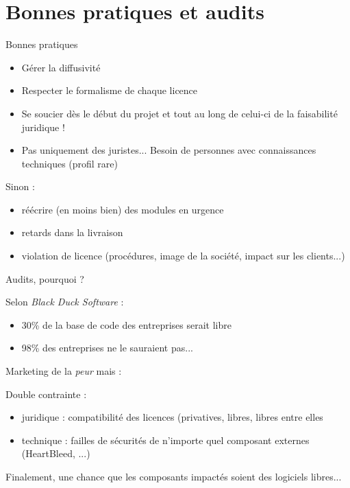 \documentclass{beamer}
\begin{document}
\section{Bonnes pratiques et audits}

\begin{frame}{Bonnes pratiques}
  \begin{itemize}
  \item Gérer la diffusivité
  \item Respecter le formalisme de chaque licence
  \item Se soucier dès le début du projet et tout au long de celui-ci de la faisabilité juridique !
  \item Pas uniquement des juristes... Besoin de personnes avec connaissances techniques (profil rare)
  \end{itemize}

Sinon :

\begin{itemize}
\item réécrire (en moins bien) des modules en urgence
\item retards dans la livraison
\item violation de licence (procédures, image de la société, impact sur les clients...)
\end{itemize}
  
\end{frame}


\begin{frame}{Audits, pourquoi ?}

Selon \textit{Black Duck Software} :
\begin{itemize}
\item 30\% de la base de code des entreprises serait libre
\item 98\% des entreprises ne le sauraient pas...

\end{itemize}

Marketing de la \textit{peur} mais :

Double contrainte :
\begin{itemize}
\item juridique : compatibilité des licences (privatives, libres, libres entre elles
\item technique : failles de sécurités de n'importe quel composant externes (HeartBleed, ...)
\end{itemize}

Finalement, une chance que les composants impactés soient des logiciels libres...
  
\end{frame}
\end{document}
